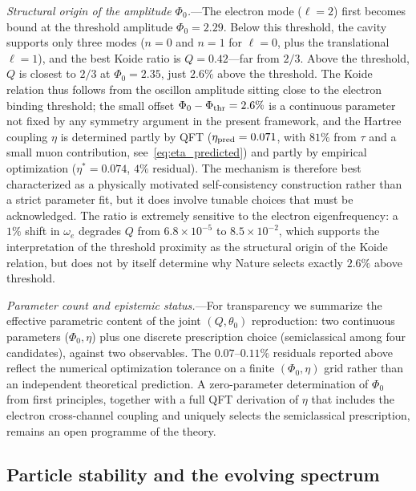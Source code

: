 \documentclass[aps,prd,onecolumn,superscriptaddress,nofootinbib,showpacs,12pt,notitlepage]{revtex4-2}
\begin{document}
\textit{Structural origin of the amplitude $\Phi_0$.}---The
electron mode ($\ell = 2$) first becomes bound at the
threshold amplitude $\Phi_0 = 2.29$.  Below this threshold,
the cavity supports only three modes ($n{=}0$ and $n{=}1$
for $\ell = 0$, plus the translational $\ell = 1$), and the
best Koide ratio is $Q = 0.42$---far from $2/3$.  Above the
threshold, $Q$ is closest to $2/3$ at $\Phi_0 = 2.35$, just
$2.6\%$ above the threshold.  The Koide relation thus follows
from the oscillon amplitude sitting close to the electron
binding threshold; the small offset
$\Phi_0 - \Phi_{\rm thr} = 2.6\%$ is a continuous parameter
not fixed by any symmetry argument in the present framework,
and the Hartree coupling $\eta$ is determined partly by QFT
($\eta_{\rm pred} = 0.071$, with $81\%$ from $\tau$ and a small
muon contribution, see~\eqref{eq:eta_predicted}) and partly by
empirical optimization ($\eta^{*} = 0.074$, $4\%$ residual).
The mechanism is therefore best characterized as a physically
motivated self-consistency construction rather than a strict
parameter fit, but it does involve tunable choices that must
be acknowledged. The ratio is extremely sensitive to the
electron eigenfrequency: a $1\%$ shift in $\omega_e$ degrades
$Q$ from $6.8 \times 10^{-5}$ to $8.5 \times 10^{-2}$, which
supports the interpretation of the threshold proximity as the
structural origin of the Koide relation, but does not by itself
determine why Nature selects exactly $2.6\%$ above threshold.

\textit{Parameter count and epistemic status.}---For
transparency we summarize the effective parametric content of
the joint $(Q, \theta_0)$ reproduction: two continuous
parameters ($\Phi_0, \eta$) plus one discrete prescription
choice (semiclassical among four candidates), against two
observables. The $0.07$--$0.11\%$ residuals reported above
reflect the numerical optimization tolerance on a finite
$(\Phi_0, \eta)$ grid rather than an independent theoretical
prediction. A zero-parameter determination of $\Phi_0$ from
first principles, together with a full QFT derivation of
$\eta$ that includes the electron cross-channel coupling and
uniquely selects the semiclassical prescription, remains an
open programme of the theory.

\subsection{Particle stability and the evolving spectrum}
\label{sec:stability_spectrum}
\end{document}
